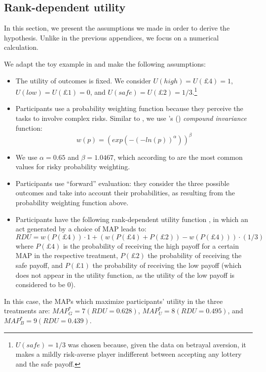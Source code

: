 \subsection{Rank-dependent utility}
\label{subsec:RDU}

In this section, we present the assumptions we made in order to derive the hypothesis.
Unlike in the previous appendices, we focus on a numerical calculation.

We adapt the toy example in \cite{Li2020a} and make the following assumptions:
\begin{itemize}
\item The utility of outcomes is fixed. We consider $U(high) = U(\pounds4) = 1$, $U(low) = U(\pounds1) = 0$, and $U(safe) = U(\pounds2) = 1/3$.\footnote{
$U(safe)=1/3$ was chosen because, given the data on betrayal aversion, it makes a mildly risk-averse player indifferent between accepting any lottery and the safe payoff.
}
\item Participants use a probability weighting function because they perceive the tasks to involve complex risks. Similar to \cite{Li2020a}, we use \citeauthor{Prelec1998}'s (\citeyear{Prelec1998}) \textit{compound invariance} function:
$$w(p) = (exp(-(-ln(p))^\alpha))^\beta$$ 
\item We use $\alpha = 0.65$ and $\beta = 1.0467$, which according to \cite{Li2020a} are the most common values for risky probability weighting.
\item Participants use ``forward'' evaluation: they consider the three possible outcomes and take into account their probabilities, as resulting from the probability weighting function above.
\item Participants have the following rank-dependent utility function \citep{Schmeidler1989}, in which an act generated by a choice of MAP leads to:
$$RDU = w(P(\pounds4)) \cdot 1 + (w(P(\pounds4) + P(\pounds2)) - w(P(\pounds4))) \cdot (1/3)$$
where $P(\pounds4)$ is the probability of receiving the high payoff for a certain MAP in the respective treatment, $P(\pounds2)$ the probability of receiving the safe payoff, and $P(\pounds1)$ the probability of receiving the low payoff (which does not appear in the utility function, as the utility of the low payoff is considered to be 0).
\end{itemize}

In this case, the MAPs which maximize participants' utility in the three treatments are: $MAP^{*}_G = 7 (RDU = 0.628)$, $MAP^{*}_U = 8 (RDU = 0.495)$, and $MAP^{*}_B = 9 (RDU = 0.439)$.


